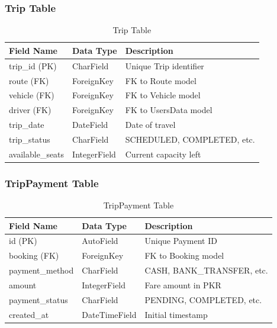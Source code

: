 \subsubsection{Trip Table}
\begin{table}[H]
\centering
\caption{Trip Table}
\renewcommand{\arraystretch}{1.5}
\begin{tabular}{|p{3cm}|p{3.5cm}|p{7cm}|}
\hline
\textbf{Field Name} & \textbf{Data Type} & \textbf{Description} \\
\hline
trip\_id (PK) & CharField & Unique Trip identifier \\
\hline
route (FK) & ForeignKey & FK to Route model \\
\hline
vehicle (FK) & ForeignKey & FK to Vehicle model \\
\hline
driver (FK) & ForeignKey & FK to UsersData model \\
\hline
trip\_date & DateField & Date of travel \\
\hline
trip\_status & CharField & SCHEDULED, COMPLETED, etc. \\
\hline
available\_seats & IntegerField & Current capacity left \\
\hline
\end{tabular}
\end{table}

\subsubsection{TripPayment Table}
\begin{table}[H]
\centering
\caption{TripPayment Table}
\renewcommand{\arraystretch}{1.5}
\begin{tabular}{|p{3cm}|p{3.5cm}|p{7cm}|}
\hline
\textbf{Field Name} & \textbf{Data Type} & \textbf{Description} \\
\hline
id (PK) & AutoField & Unique Payment ID \\
\hline
booking (FK) & ForeignKey & FK to Booking model \\
\hline
payment\_method & CharField & CASH, BANK\_TRANSFER, etc. \\
\hline
amount & IntegerField & Fare amount in PKR \\
\hline
payment\_status & CharField & PENDING, COMPLETED, etc. \\
\hline
created\_at & DateTimeField & Initial timestamp \\
\hline
\end{tabular}
\end{table}

